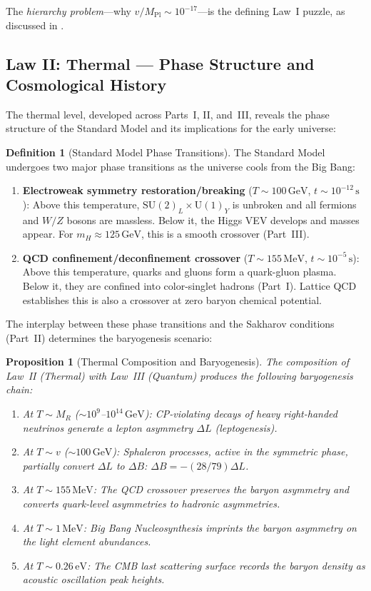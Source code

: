\documentclass[12pt]{article}
\newtheorem{proposition}[theorem]{Proposition}
\theoremstyle{definition}
\newtheorem{definition}[theorem]{Definition}
\theoremstyle{remark}
\newcommand{\GeV}{\,\mathrm{GeV}}
\newcommand{\MeV}{\,\mathrm{MeV}}
\newcommand{\su}[1]{\mathrm{SU}(#1)}
\newcommand{\uu}[1]{\mathrm{U}(#1)}
\newcommand{\Mpl}{M_{\mathrm{Pl}}}
\begin{document}
The \emph{hierarchy problem}---why $v/\Mpl \sim 10^{-17}$---is the defining Law~I puzzle, as discussed in .

\subsection{Law II: Thermal --- Phase Structure and Cosmological History}

The thermal level, developed across Parts~I, II, and~III, reveals the phase structure of the Standard Model and its implications for the early universe:

\begin{definition}[Standard Model Phase Transitions]
\label{def:phase-transitions}
The Standard Model undergoes two major phase transitions as the universe cools from the Big Bang:
\begin{enumerate}
\item \textbf{Electroweak symmetry restoration/breaking} ($T \sim 100\GeV$, $t \sim 10^{-12}\,\mathrm{s}$): Above this temperature, $\su{2}_L \times \uu{1}_Y$ is unbroken and all fermions and $W/Z$ bosons are massless. Below it, the Higgs VEV develops and masses appear. For $m_H \approx 125\GeV$, this is a smooth crossover (Part~III).
\item \textbf{QCD confinement/deconfinement crossover} ($T \sim 155\MeV$, $t \sim 10^{-5}\,\mathrm{s}$): Above this temperature, quarks and gluons form a quark-gluon plasma. Below it, they are confined into color-singlet hadrons (Part~I). Lattice QCD establishes this is also a crossover at zero baryon chemical potential.
\end{enumerate}
\end{definition}

The interplay between these phase transitions and the Sakharov conditions (Part~II) determines the baryogenesis scenario:

\begin{proposition}[Thermal Composition and Baryogenesis]
\label{prop:thermal-baryogenesis}
The composition of Law~II (Thermal) with Law~III (Quantum) produces the following baryogenesis chain:
\begin{enumerate}
\item At $T \sim M_R$ ($\sim 10^{9}$--$10^{14}\GeV$): CP-violating decays of heavy right-handed neutrinos generate a lepton asymmetry $\Delta L$ (leptogenesis).
\item At $T \sim v$ ($\sim 100\GeV$): Sphaleron processes, active in the symmetric phase, partially convert $\Delta L$ to $\Delta B$: $\Delta B = -(28/79)\Delta L$.
\item At $T \sim 155\MeV$: The QCD crossover preserves the baryon asymmetry and converts quark-level asymmetries to hadronic asymmetries.
\item At $T \sim 1\MeV$: Big Bang Nucleosynthesis imprints the baryon asymmetry on the light element abundances.
\item At $T \sim 0.26\,\mathrm{eV}$: The CMB last scattering surface records the baryon density as acoustic oscillation peak heights.
\end{enumerate}
\end{proposition}
\end{document}
